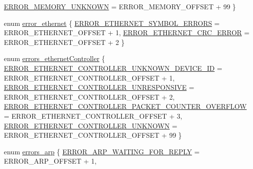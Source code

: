 \begin{DoxyCompactItemize}
\mbox{\hyperlink{group__error_gga4d2300fd6df4ff42db6d34ca3bd63ea2a6496299e8c486deb9954e3b03b7ba1a6}{E\+R\+R\+O\+R\+\_\+\+M\+E\+M\+O\+R\+Y\+\_\+\+U\+N\+K\+N\+O\+WN}} = E\+R\+R\+O\+R\+\_\+\+M\+E\+M\+O\+R\+Y\+\_\+\+O\+F\+F\+S\+ET + 99
 \}
\item 
enum \mbox{\hyperlink{group__error_gabd4054d37209b93794967dfe37ef2588}{error\+\_\+ethernet}} \{ \mbox{\hyperlink{group__error_ggabd4054d37209b93794967dfe37ef2588a3bc5b7fc971ced9dccd076ce4a3dd1e3}{E\+R\+R\+O\+R\+\_\+\+E\+T\+H\+E\+R\+N\+E\+T\+\_\+\+S\+Y\+M\+B\+O\+L\+\_\+\+E\+R\+R\+O\+RS}} = E\+R\+R\+O\+R\+\_\+\+E\+T\+H\+E\+R\+N\+E\+T\+\_\+\+O\+F\+F\+S\+ET + 1, 
\mbox{\hyperlink{group__error_ggabd4054d37209b93794967dfe37ef2588a0c34c074cc52d07009c8c7c34b7b7b70}{E\+R\+R\+O\+R\+\_\+\+E\+T\+H\+E\+R\+N\+E\+T\+\_\+\+C\+R\+C\+\_\+\+E\+R\+R\+OR}} = E\+R\+R\+O\+R\+\_\+\+E\+T\+H\+E\+R\+N\+E\+T\+\_\+\+O\+F\+F\+S\+ET + 2
 \}
\item 
enum \mbox{\hyperlink{group__error_gae82d87a039b0b080f43f6d790fe642e9}{errors\+\_\+ethernet\+Controller}} \{ \mbox{\hyperlink{group__error_ggae82d87a039b0b080f43f6d790fe642e9adbb4de8c31875d6b09862bd6f9cfbc51}{E\+R\+R\+O\+R\+\_\+\+E\+T\+H\+E\+R\+N\+E\+T\+\_\+\+C\+O\+N\+T\+R\+O\+L\+L\+E\+R\+\_\+\+U\+N\+K\+N\+O\+W\+N\+\_\+\+D\+E\+V\+I\+C\+E\+\_\+\+ID}} = E\+R\+R\+O\+R\+\_\+\+E\+T\+H\+E\+R\+N\+E\+T\+\_\+\+C\+O\+N\+T\+R\+O\+L\+L\+E\+R\+\_\+\+O\+F\+F\+S\+ET + 1, 
\mbox{\hyperlink{group__error_ggae82d87a039b0b080f43f6d790fe642e9a597a00d37e6a842f7d2d72124ffdb3b4}{E\+R\+R\+O\+R\+\_\+\+E\+T\+H\+E\+R\+N\+E\+T\+\_\+\+C\+O\+N\+T\+R\+O\+L\+L\+E\+R\+\_\+\+U\+N\+R\+E\+S\+P\+O\+N\+S\+I\+VE}} = E\+R\+R\+O\+R\+\_\+\+E\+T\+H\+E\+R\+N\+E\+T\+\_\+\+C\+O\+N\+T\+R\+O\+L\+L\+E\+R\+\_\+\+O\+F\+F\+S\+ET + 2, 
\mbox{\hyperlink{group__error_ggae82d87a039b0b080f43f6d790fe642e9a70b6f3c0286930f7f579bf81515bab6f}{E\+R\+R\+O\+R\+\_\+\+E\+T\+H\+E\+R\+N\+E\+T\+\_\+\+C\+O\+N\+T\+R\+O\+L\+L\+E\+R\+\_\+\+P\+A\+C\+K\+E\+T\+\_\+\+C\+O\+U\+N\+T\+E\+R\+\_\+\+O\+V\+E\+R\+F\+L\+OW}} = E\+R\+R\+O\+R\+\_\+\+E\+T\+H\+E\+R\+N\+E\+T\+\_\+\+C\+O\+N\+T\+R\+O\+L\+L\+E\+R\+\_\+\+O\+F\+F\+S\+ET + 3, 
\mbox{\hyperlink{group__error_ggae82d87a039b0b080f43f6d790fe642e9a17c6e8431d659771c9cca7693f6eb592}{E\+R\+R\+O\+R\+\_\+\+E\+T\+H\+E\+R\+N\+E\+T\+\_\+\+C\+O\+N\+T\+R\+O\+L\+L\+E\+R\+\_\+\+U\+N\+K\+N\+O\+WN}} = E\+R\+R\+O\+R\+\_\+\+E\+T\+H\+E\+R\+N\+E\+T\+\_\+\+C\+O\+N\+T\+R\+O\+L\+L\+E\+R\+\_\+\+O\+F\+F\+S\+ET + 99
 \}
\item 
enum \mbox{\hyperlink{group__error_gadc6f7acf887618df05bc50c50fee037b}{errors\+\_\+arp}} \{ \mbox{\hyperlink{group__error_ggadc6f7acf887618df05bc50c50fee037bac9e5c709706b773c6e42660a7720b716}{E\+R\+R\+O\+R\+\_\+\+A\+R\+P\+\_\+\+W\+A\+I\+T\+I\+N\+G\+\_\+\+F\+O\+R\+\_\+\+R\+E\+P\+LY}} = E\+R\+R\+O\+R\+\_\+\+A\+R\+P\+\_\+\+O\+F\+F\+S\+ET + 1, 

\end{DoxyCompactItemize}
